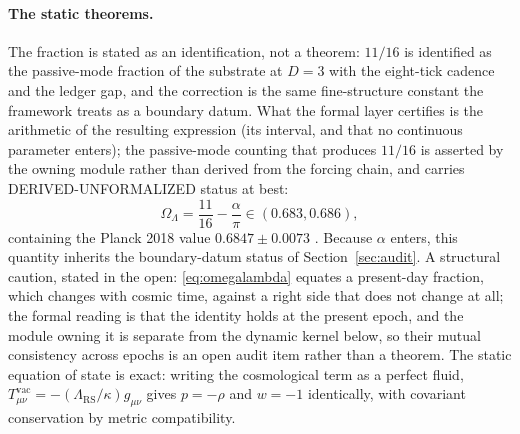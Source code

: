 \documentclass[11pt,letterpaper]{article}
\begin{document}
\paragraph{The static theorems.} The fraction is stated as an identification, not a theorem: $11/16$ is identified as the passive-mode fraction of the substrate at $D=3$ with the eight-tick cadence and the ledger gap, and the correction is the same fine-structure constant the framework treats as a boundary datum. What the formal layer certifies is the arithmetic of the resulting expression (its interval, and that no continuous parameter enters); the passive-mode counting that produces $11/16$ is asserted by the owning module rather than derived from the forcing chain, and carries DERIVED-UNFORMALIZED status at best:
\begin{equation}
\Omega_{\Lambda}=\frac{11}{16}-\frac{\alpha}{\pi}\in(0.683,0.686),
\label{eq:omegalambda}
\end{equation}
containing the Planck 2018 value $0.6847\pm0.0073$ \cite{Planck2018}. Because $\alpha$ enters, this quantity inherits the boundary-datum status of Section~\ref{sec:audit}. A structural caution, stated in the open: \eqref{eq:omegalambda} equates a present-day fraction, which changes with cosmic time, against a right side that does not change at all; the formal reading is that the identity holds at the present epoch, and the module owning it is separate from the dynamic kernel below, so their mutual consistency across epochs is an open audit item rather than a theorem. The static equation of state is exact: writing the cosmological term as a perfect fluid, $T^{\mathrm{vac}}_{\mu\nu}=-(\Lambda_{\mathrm{RS}}/\kappa)g_{\mu\nu}$ gives $p=-\rho$ and $w=-1$ identically, with covariant conservation by metric compatibility.
\end{document}

